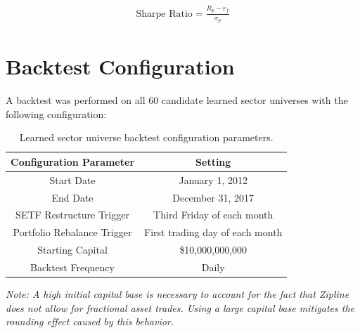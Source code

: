 \documentclass[../main.tex]{subfiles}
\begin{document}
\begin{gather*}
    \text{Sharpe Ratio} = \frac{R_p - r_f}{\sigma_p}
\end{gather*}


\section{Backtest Configuration}

A backtest was performed on all 60 candidate learned sector universes with the following configuration:

\begin{table}[h!]
    \centering
    \begin{tabular}{|c|c|}
        \hline
        \textbf{Configuration Parameter} & \textbf{Setting} \\
        \hline
        Start Date & January 1, 2012 \\
        End Date & December 31, 2017 \\
        SETF Restructure Trigger & Third Friday of each month \\
        Portfolio Rebalance Trigger & First trading day of each month \\
        Starting Capital & \$10,000,000,000 \\
        Backtest Frequency & Daily \\
        \hline
    \end{tabular}
    \caption{Learned sector universe backtest configuration parameters.}
    \label{table:candidate_universe_ranking:backtest_configuration}
\end{table}

\textit{Note: A high initial capital base is necessary to account for the fact that Zipline does not allow for fractional asset trades. Using a large capital base mitigates the rounding effect caused by this behavior.}
\end{document}
